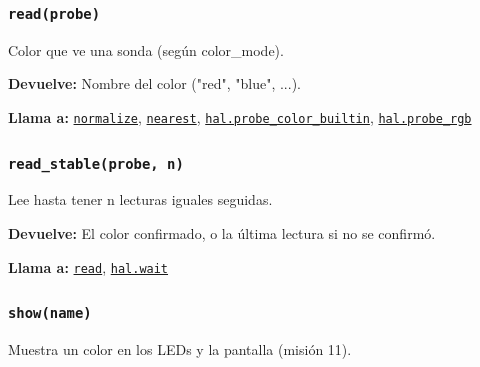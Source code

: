 \subsubsection{\texttt{read(probe)}}\label{fn:colors:read}
\noindent Color que ve una sonda (según color\_mode).

\par{}\par\smallskip
\noindent\textbf{Devuelve:} Nombre del color ("red", "blue", ...).\par
\noindent\textbf{Llama a:} \hyperref[fn:colors:normalize]{\texttt{normalize}}, \hyperref[fn:colors:nearest]{\texttt{nearest}}, \hyperref[fn:hal:probe-color-builtin]{\texttt{hal.probe\_\allowbreak{}color\_\allowbreak{}builtin}}, \hyperref[fn:hal:probe-rgb]{\texttt{hal.probe\_\allowbreak{}rgb}}\par

\subsubsection{\texttt{read\_\allowbreak{}stable(probe, n)}}\label{fn:colors:read-stable}
\noindent Lee hasta tener n lecturas iguales seguidas.

\par{}\par\smallskip
\noindent\textbf{Devuelve:} El color confirmado, o la última lectura si no se confirmó.\par
\noindent\textbf{Llama a:} \hyperref[fn:colors:read]{\texttt{read}}, \hyperref[fn:hal:wait]{\texttt{hal.wait}}\par

\subsubsection{\texttt{show(name)}}\label{fn:colors:show}
\noindent Muestra un color en los LEDs y la pantalla (misión 11).

